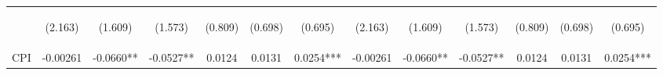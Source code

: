 \documentclass[]{article}
\begin{document}
\begin{center}
\begin{tabular}{lcccccccccccc}
\vspace{4pt} & \begin{footnotesize}(2.163)\end{footnotesize} & \begin{footnotesize}(1.609)\end{footnotesize} & \begin{footnotesize}(1.573)\end{footnotesize} & \begin{footnotesize}(0.809)\end{footnotesize} & \begin{footnotesize}(0.698)\end{footnotesize} & \begin{footnotesize}(0.695)\end{footnotesize} & \begin{footnotesize}(2.163)\end{footnotesize} & \begin{footnotesize}(1.609)\end{footnotesize} & \begin{footnotesize}(1.573)\end{footnotesize} & \begin{footnotesize}(0.809)\end{footnotesize} & \begin{footnotesize}(0.698)\end{footnotesize} & \begin{footnotesize}(0.695)\end{footnotesize} \\
CPI & -0.00261 & -0.0660** & -0.0527** & 0.0124 & 0.0131 & 0.0254*** & -0.00261 & -0.0660** & -0.0527** & 0.0124 & 0.0131 & 0.0254*** \\

\end{tabular}
\end{center}
\end{document}
